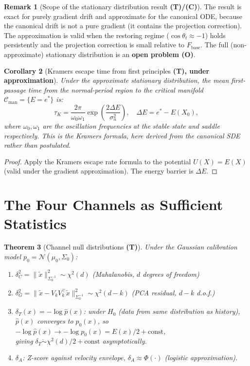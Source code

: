 \documentclass[11pt,a4paper]{article}
\newtheorem{theorem}{Theorem}[section]
\newtheorem{corollary}[theorem]{Corollary}
\theoremstyle{definition}
\newtheorem{remark}[theorem]{Remark}
\newcommand{\Fbase}{F_{\mathrm{base}}}
\begin{document}
\begin{remark}[Scope of the stationary distribution result \textbf{(T)/(C)}]
The result is exact for purely gradient drift and approximate for the canonical ODE,
because the canonical drift is not a pure gradient (it contains the projection correction).
The approximation is valid when the restoring regime ($\cos\theta_t \approx -1$)
holds persistently and the projection correction is small relative to $\Fbase$.
The full (non-approximate) stationary distribution is an \textbf{open problem (O)}.
\end{remark}

\begin{corollary}[Kramers escape time from first principles \textbf{(T), under approximation}]
Under the approximate stationary distribution, the mean first-passage time from the
normal-period region to the critical manifold $\mathcal{C}_\mathrm{man} = \{E = e^*\}$ is:
\[
\tau_K = \frac{2\pi}{\omega_0\omega_1}\exp\!\left(\frac{2\Delta E}{\sigma_n^2}\right),
\quad \Delta E = e^* - E(X_0),
\]
where $\omega_0, \omega_1$ are the oscillation frequencies at the stable state and
saddle respectively.
This is the Kramers formula, here derived from the canonical SDE rather than
postulated.
\end{corollary}

\begin{proof}
Apply the Kramers escape rate formula to the potential $U(X) = E(X)$
(valid under the gradient approximation). The energy barrier is $\Delta E$.
\end{proof}

\section{The Four Channels as Sufficient Statistics}
\label{sec:sufficient_stats}

\begin{theorem}[Channel null distributions \textbf{(T)}]
\label{thm:null_distributions}
Under the Gaussian calibration model $p_0 = \mathcal{N}(\mu_0,\Sigma_0)$:

\begin{enumerate}[label=(\roman*)]
\item $\delta_C^2 = \|\tilde x\|_{\Sigma_0^{-1}}^2 \sim \chi^2(d)$ \hfill (Mahalanobis, $d$ degrees of freedom)
\item $\delta_G^2 = \|\tilde x - V_kV_k^\top\tilde x\|_{\Sigma_0^{-1}}^2 \sim \chi^2(d-k)$ \hfill (PCA residual, $d-k$ d.o.f.)
\item $\delta_T(x) = -\log\hat p(x)$: under $H_0$ (data from same distribution as history), \\
  $\hat p(x)$ converges to $p_0(x)$, so $-\log\hat p(x) \to -\log p_0(x) = E(x)/2 + \mathrm{const}$, \\
  giving $\delta_T \dot\sim \chi^2(d)/2 + \mathrm{const}$ asymptotically.
\item $\delta_A$: Z-score against velocity envelope, $\delta_A \approx \Phi(\cdot)$ (logistic approximation).
\end{enumerate}
\end{theorem}
\end{document}
